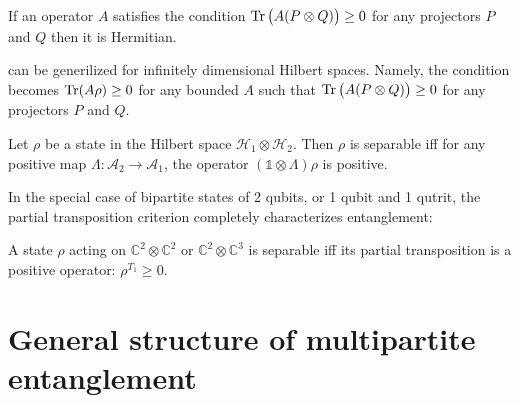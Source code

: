 \documentclass[12pt]{report}
\begin{document}
\begin{remark}
	If an operator $A$ satisfies the condition $\Tr\big( A(P \otimes Q) \big) \ge 0$
	for any projectors $P$ and $Q$ then it is Hermitian.
\end{remark}

\begin{remark}
	 can be generilized for infinitely dimensional Hilbert spaces.
	Namely, the condition becomes $\Tr(A\rho) \ge 0$ for any bounded $A$ such that
	$\Tr\big( A(P\otimes Q) \big) \ge 0$ for any projectors $P$ and $Q$.
\end{remark}

\begin{thm}
	Let $\rho$ be a state in the Hilbert space $\mathcal H_1 \otimes \mathcal H_2$.
	Then $\rho$ is separable iff for any positive map
	$\Lambda : \mathcal A_2 \to \mathcal A_1$,
	the operator $(\mathds1 \otimes \Lambda)\rho$ is positive.
\end{thm}

In the special case of bipartite states of 2 qubits, or 1 qubit and 1 qutrit,
the partial transposition criterion completely characterizes entanglement:
\begin{thm}
	A state $\rho$ acting on $\mathbb C^2 \otimes \mathbb C^2$
	or $\mathbb C^2 \otimes \mathbb C^3$ is separable iff
	its partial transposition is a positive operator: $\rho^{T_1} \ge 0$.
\end{thm}

\section{General structure of multipartite entanglement}
\end{document}
